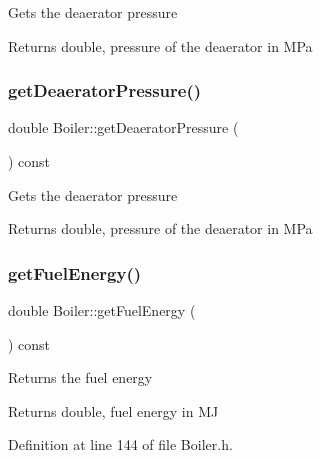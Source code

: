 Gets the deaerator pressure \begin{DoxyReturn}{Returns}
double, pressure of the deaerator in M\+Pa 
\end{DoxyReturn}
\mbox{\label{class_boiler_aad4786e7b68084e65a35dd6235517b8c}} 
\subsubsection{\texorpdfstring{get\+Deaerator\+Pressure()}{getDeaeratorPressure()}\hspace{0.1cm}{\footnotesize\ttfamily [3/3]}}
{\footnotesize\ttfamily double Boiler\+::get\+Deaerator\+Pressure (\begin{DoxyParamCaption}{ }\end{DoxyParamCaption}) const}

Gets the deaerator pressure \begin{DoxyReturn}{Returns}
double, pressure of the deaerator in M\+Pa 
\end{DoxyReturn}
\mbox{\label{class_boiler_a55542a761669c842163b20932f9747d3}} 
\subsubsection{\texorpdfstring{get\+Fuel\+Energy()}{getFuelEnergy()}\hspace{0.1cm}{\footnotesize\ttfamily [1/3]}}
{\footnotesize\ttfamily double Boiler\+::get\+Fuel\+Energy (\begin{DoxyParamCaption}{ }\end{DoxyParamCaption}) const\hspace{0.3cm}{\ttfamily [inline]}}

Returns the fuel energy \begin{DoxyReturn}{Returns}
double, fuel energy in MJ 
\end{DoxyReturn}


Definition at line 144 of file Boiler.\+h.

\mbox{\label{class_boiler_a55542a761669c842163b20932f9747d3}} 
